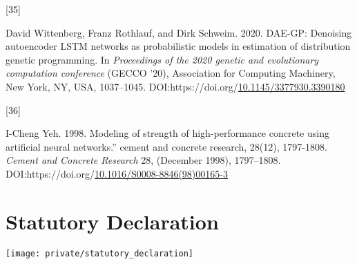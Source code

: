 \documentclass[
  11pt,
]{article}
\newlength{\cslhangindent}
\newlength{\csllabelwidth}
\newlength{\cslentryspacingunit} %
\newenvironment{CSLReferences}[2] %
 {%
  \setlength{\parindent}{0pt}
  \ifodd #1
  \let\oldpar\par
  \def\par{\hangindent=\cslhangindent\oldpar}
  \fi
  \setlength{\parskip}{#2\cslentryspacingunit}
 }%
 {}
\newcommand{\CSLLeftMargin}[1]{\parbox[t]{\csllabelwidth}{#1}}
\newcommand{\CSLRightInline}[1]{\parbox[t]{\linewidth - \csllabelwidth}{#1}\break}
\begin{document}
\begin{CSLReferences}{0}{0}
\leavevmode{}%
\CSLLeftMargin{{[}35{]} }%
\CSLRightInline{David Wittenberg, Franz Rothlauf, and Dirk Schweim. 2020. DAE-GP: Denoising autoencoder LSTM networks as probabilistic models in estimation of distribution genetic programming. In \emph{Proceedings of the 2020 genetic and evolutionary computation conference} (GECCO '20), Association for Computing Machinery, New York, NY, USA, 1037--1045. DOI:https://doi.org/\href{https://doi.org/10.1145/3377930.3390180}{10.1145/3377930.3390180}}

\leavevmode{}%
\CSLLeftMargin{{[}36{]} }%
\CSLRightInline{I-Cheng Yeh. 1998. Modeling of strength of high-performance concrete using artificial neural networks.'' cement and concrete research, 28(12), 1797-1808. \emph{Cement and Concrete Research} 28, (December 1998), 1797--1808. DOI:https://doi.org/\href{https://doi.org/10.1016/S0008-8846(98)00165-3}{10.1016/S0008-8846(98)00165-3}}

\end{CSLReferences}

\newpage

\hypertarget{IV}{%
\section*{Statutory Declaration}\label{IV}}

\begin{center}\texttt{[image: private/statutory\_declaration]} \end{center}
\end{document}
